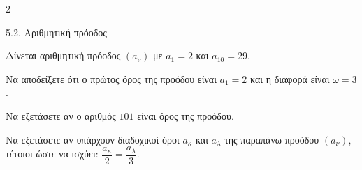 \begin{ylh}{2}
    \item 5.2. Αριθμητική πρόοδος
\end{ylh}
Δίνεται αριθμητική πρόοδος $(a_\nu)$ με $a_1 = 2$ και $a_{10} = 29$.

\begin{alist}
\item Να αποδείξετε ότι ο πρώτος όρος της προόδου είναι $a_1 = 2$ και η διαφορά είναι $\omega = 3$.
\item Να εξετάσετε αν ο αριθμός $101$ είναι όρος της προόδου.
\item Να εξετάσετε αν υπάρχουν διαδοχικοί όροι $a_\kappa$ και $a_\lambda$ της παραπάνω προόδου $(a_\nu)$, τέτοιοι ώστε να ισχύει: $\dfrac{a_\kappa}{2} = \dfrac{a_\lambda}{3}$.
\end{alist}

